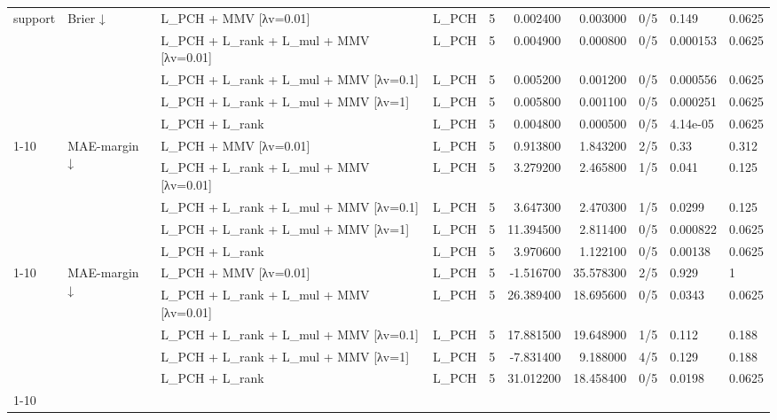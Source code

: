\begin{tabular}{llllrrrlll}
\multirow[t]{5}{*}{support} & \multirow[t]{5}{*}{Brier ↓} & L\_PCH + MMV [λv=0.01] & L\_PCH & 5 & 0.002400 & 0.003000 & 0/5 & 0.149 & 0.0625 \\
 &  & L\_PCH + L\_rank + L\_mul + MMV [λv=0.01] & L\_PCH & 5 & 0.004900 & 0.000800 & 0/5 & 0.000153 & 0.0625 \\
 &  & L\_PCH + L\_rank + L\_mul + MMV [λv=0.1] & L\_PCH & 5 & 0.005200 & 0.001200 & 0/5 & 0.000556 & 0.0625 \\
 &  & L\_PCH + L\_rank + L\_mul + MMV [λv=1] & L\_PCH & 5 & 0.005800 & 0.001100 & 0/5 & 0.000251 & 0.0625 \\
 &  & L\_PCH + L\_rank & L\_PCH & 5 & 0.004800 & 0.000500 & 0/5 & 4.14e-05 & 0.0625 \\
\cline{1-10} \cline{2-10}
\multirow[t]{5}{*}{metabric} & \multirow[t]{5}{*}{MAE-margin ↓} & L\_PCH + MMV [λv=0.01] & L\_PCH & 5 & 0.913800 & 1.843200 & 2/5 & 0.33 & 0.312 \\
 &  & L\_PCH + L\_rank + L\_mul + MMV [λv=0.01] & L\_PCH & 5 & 3.279200 & 2.465800 & 1/5 & 0.041 & 0.125 \\
 &  & L\_PCH + L\_rank + L\_mul + MMV [λv=0.1] & L\_PCH & 5 & 3.647300 & 2.470300 & 1/5 & 0.0299 & 0.125 \\
 &  & L\_PCH + L\_rank + L\_mul + MMV [λv=1] & L\_PCH & 5 & 11.394500 & 2.811400 & 0/5 & 0.000822 & 0.0625 \\
 &  & L\_PCH + L\_rank & L\_PCH & 5 & 3.970600 & 1.122100 & 0/5 & 0.00138 & 0.0625 \\
\cline{1-10} \cline{2-10}
\multirow[t]{5}{*}{support} & \multirow[t]{5}{*}{MAE-margin ↓} & L\_PCH + MMV [λv=0.01] & L\_PCH & 5 & -1.516700 & 35.578300 & 2/5 & 0.929 & 1 \\
 &  & L\_PCH + L\_rank + L\_mul + MMV [λv=0.01] & L\_PCH & 5 & 26.389400 & 18.695600 & 0/5 & 0.0343 & 0.0625 \\
 &  & L\_PCH + L\_rank + L\_mul + MMV [λv=0.1] & L\_PCH & 5 & 17.881500 & 19.648900 & 1/5 & 0.112 & 0.188 \\
 &  & L\_PCH + L\_rank + L\_mul + MMV [λv=1] & L\_PCH & 5 & -7.831400 & 9.188000 & 4/5 & 0.129 & 0.188 \\
 &  & L\_PCH + L\_rank & L\_PCH & 5 & 31.012200 & 18.458400 & 0/5 & 0.0198 & 0.0625 \\
\cline{1-10} \cline{2-10}
\bottomrule
\end{tabular}

